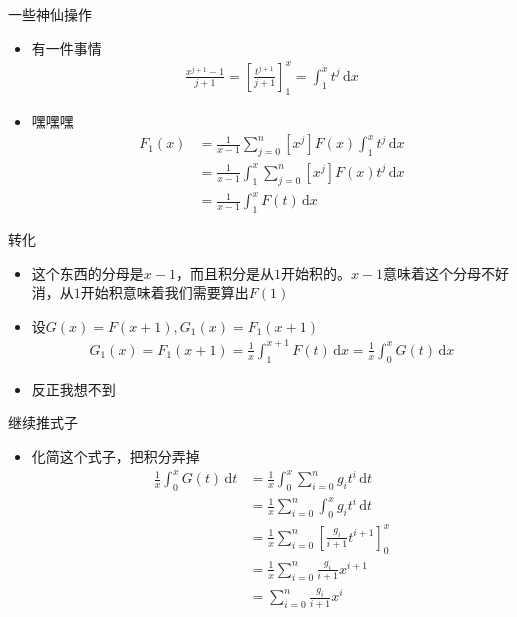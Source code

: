 \documentclass{beamer}
\begin{document}
\begin{frame}{一些神仙操作}
    \begin{itemize}
        \item 有一件事情 \pause
        $$\begin{aligned}
            \frac{x^{j + 1} - 1}{j + 1} = \left[\frac{t^{j + 1}}{j + 1}\right]_1^x = \int_{1}^{x}t^j  \,\mathrm{d}x 
        \end{aligned}$$ \pause
        \item 嘿嘿嘿
        $$\begin{aligned}
            F_1(x) &= \frac{1}{x - 1}\sum_{j = 0}^n[x^j]F(x)\int_{1}^{x}t^j  \,\mathrm{d}x\\
            &= \frac{1}{x - 1}\int_{1}^{x}\sum_{j = 0}^n[x^j]F(x)t^j \,\mathrm{d}x\\
            &= \frac{1}{x - 1}\int_{1}^{x}F(t)\,\mathrm{d}x
        \end{aligned}$$
    \end{itemize}
\end{frame}

\begin{frame}{转化}
    \begin{itemize}
        \item 这个东西的分母是$x - 1$，而且积分是从$1$开始积的。$x - 1$意味着这个分母不好消，从$1$开始积意味着我们需要算出$F(1)$ \pause
        \item 设$G(x) = F(x + 1), G_1(x) = F_1(x + 1)$ \pause
        $$\begin{aligned}
            G_1(x) = F_1(x + 1) = \frac{1}{x}\int_{1}^{x + 1}F(t)  \,\mathrm{d}x = \frac{1}{x}\int_{0}^{x}G(t)  \,\mathrm{d}x
        \end{aligned}$$
        \item 反正我想不到
    \end{itemize}
\end{frame}

\begin{frame}{继续推式子}
    \begin{itemize}
        \item 化简这个式子，把积分弄掉 \pause
        $$
        \begin{aligned} \frac{1}{x}\int_0^xG(t)\,\mathrm{d}t&=\frac{1}{x}\int_0^x\sum_{i=0}^ng_it^i\,\mathrm{d}t\\\ &=\frac{1}{x}\sum_{i=0}^n\int_0^xg_it^i\,\mathrm{d}t\\\ &=\frac{1}{x}\sum_{i=0}^n[\frac{g_i}{i+1}t^{i+1}]_0^x\\\ &=\frac{1}{x}\sum_{i=0}^n\frac{g_i}{i+1}x^{i+1}\\\ &=\sum_{i=0}^n\frac{g_i}{i+1}x^i \end{aligned}
        $$
    \end{itemize}
\end{frame}
\end{document}
